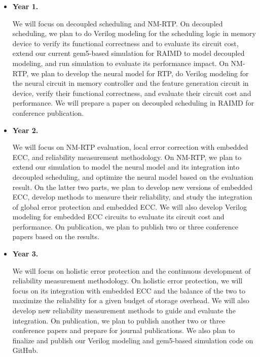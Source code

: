\documentclass[11pt]{article}
\begin{document}
\begin{itemize}

\item {\bf Year 1.\ }

We will focus on decoupled scheduling and NM-RTP.  On decoupled scheduling, we
plan to do Verilog modeling for the scheduling logic in memory device to verify
its functional correctness and to evaluate its circuit cost, extend our current
gem5-based simulation for RAIMD to model decoupled modeling, and run simulation
to evaluate its performance impact. On NM-RTP, we plan to develop the neural
model for RTP, do Verilog modeling for the neural circuit in memory controller
and the feature generation circuit in device, verify their functional
correctness, and evaluate their circuit cost and performance.  We will prepare a
paper on decoupled scheduling in RAIMD for conference publication.

\item {\bf Year 2.\ }

We will focus on NM-RTP evaluation, local error correction with embedded ECC,
and reliability measurement methodology.  On NM-RTP, we plan to extend our
simulation to model the neural model and its integration into decoupled
scheduling, and optimize the neural model based on the evaluation result.  On
the latter two parts, we plan to develop new versions of embedded ECC, develop
methods to measure their reliability, and study the integration of global error
protection and embedded ECC.  We will also develop Verilog modeling for embedded
ECC circuits to evaluate its circuit cost and performance.  On publication, we
plan to publish two or three conference papers based on the results.

\item {\bf Year 3.\ }

We will focus on holistic error protection and the continuous development of
reliability measurement methodology.  On holistic error protection, we will
focus on its integration with embedded ECC and the balance of the two to
maximize the reliability for a given budget of storage overhead. We will also
develop new reliability measurement methods to guide and evaluate the
integration.  On publication, we plan to publish another two or three conference
papers and prepare for journal publications.  We also plan to finalize and
publish our Verilog modeling and gem5-based simulation code on GitHub.

\end{itemize}
\end{document}
